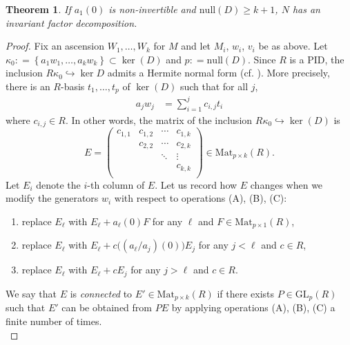 \documentclass[11pt]{article}
\newtheorem{theorem}[theo]{Theorem}
\theoremstyle{definition}
\numberwithin{equation}{section}
\newcommand{\GL}{\mathrm{GL}}
\begin{document}
 
 \begin{theorem}   \label{mainabsteo1}    If $ a_{1}(0) $ is non-invertible  and  $ \mathrm{null}(D) \geq   k + 1 $,  
$ N $ has an invariant factor decomposition. 
\end{theorem}  
\begin{proof}  Fix an ascension $ W_{1}, \ldots, W_{k} $ for $ M $ and let $ M_{i} $, $ w_{i} $, $ v_{i} $ be as above. Let $ \kappa_{0} :  = \left \{ a_{1}w_{1} , \ldots, a_{k} w_{k} \right \}   \subset \ker(D)   $     
and $ p :  = \mathrm{null}(D) $.  Since $ R $ is a PID, the inclusion $ R \kappa_{0}  \hookrightarrow \ker D $ admits a Hermite normal form (cf. \cite[\S 3.2]{Zassenhaus}).  More precisely, there is an $ R $-basis $  t_{1}, \ldots, t_{p} $ of $ \ker ( D  ) $  such  that  for all $ j $,    
\begin{align}  \label{hermiteeq}  a_{j}  w_{j}     & =  \sum_{i = 1 } ^ {  j  }   c_{i,j} t_{i}    %
\end{align}
where   $     c_{i,j} \in R $. In other words, the matrix of the inclusion $ R \kappa _{0}  \hookrightarrow \ker (D) $ is
\[E =   \left (  \begin{matrix} c_{1,1} & c_{1,2} & \cdots & c_{1,k}   \\
& c_{2,2} & \cdots & c_{2,k} \\
 &  &  \ddots & \vdots  \\
 &  & & c_{k,k} \\
 & 
\end{matrix}  \right   )  \in  \mathrm{Mat}_{p \times k } (  R    ).\]
Let $ E_{i} $ denote the $ i $-th column of $ E $. Let us record how $ E $ changes when we modify the generators $ w_{i}   $ with respect to operations (A), (B), (C): 
\begin{enumerate} 
\item [(A)] replace $E_{\ell}  $ with $ E_{\ell} + a_{\ell} (0) F $  for any $ \ell $ and $ F  \in \mathrm{Mat}_{p \times 1}(R) $,    
\item[(B)]   replace $ E_{\ell} $ with $ E_{\ell} + c \big((a_{\ell}/a_{j})(0)\big) E_{j}  $  for any $ j   <  \ell $ and $ c \in  R $,    
\item [(C)] replace $ E_{\ell} $ with $ E_{\ell} + c E_{j} $ for any $  j    >  \ell  $ and $ c \in R $.        
\end{enumerate} 
We say that $ E $ is \emph{connected} to $ E ' \in \mathrm{Mat}_{p \times k}(R) $ if there exists  $ P \in \GL_{p}(R) $ such that $ E' $ can be obtained from $ PE $ by applying operations (A), (B), (C) a finite number of times. \\


\end{proof}
\end{document}
